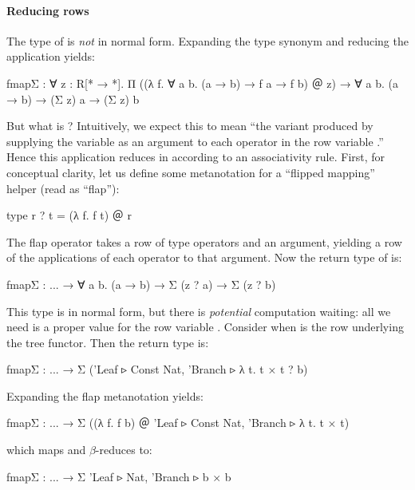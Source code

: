 \documentclass[sigplan,screen]{acmart}
\begin{document}
\paragraph{Reducing rows}
\label{sec:reducing-rows2}

The type of  is \emph{not} in normal form. Expanding the  type synonym and reducing the application   yields:


\begin{rosi}
fmapΣ : ∀ z : R[* → *].
        Π ((λ f. ∀ a b. 
            (a → b) → f a → f b) ＠ z) →
        ∀ a b. (a → b) → (Σ z) a → (Σ z) b 
\end{rosi}


But what is ? Intuitively, we expect this to mean ``the variant produced by supplying the variable  as an argument to each operator in the row variable .'' Hence this application reduces in \Rome{} according to an associativity rule. First, for conceptual clarity, let us define some metanotation for a ``flipped mapping'' helper  (read as ``flap''):

\begin{rosi}
type r ? t = (λ f. f t) ＠ r
\end{rosi}

\Ni The flap operator takes a row of type operators and an argument, yielding a row of the applications of each operator to that argument. Now the return type of  is:

\begin{rosi}
fmapΣ : ... → ∀ a b. (a → b) → Σ (z ? a) → Σ (z ? b) 
\end{rosi}

This type is in normal form, but there is \emph{potential} computation waiting: all we need is a proper value for the row variable . Consider when  is the row underlying the tree functor. Then the return type is:

\begin{rosi}
fmapΣ : ... → Σ ({'Leaf ▹ Const Nat, 
                   'Branch ▹ λ t. t × t} ? b)
\end{rosi}

\Ni Expanding the flap metanotation yields:
\begin{rosi}
fmapΣ : ... → Σ ((λ f. f b) ＠  
               {'Leaf ▹ Const Nat, 'Branch ▹ λ t. t × t})
\end{rosi}
\Ni which maps and $\beta$-reduces to: 

\begin{rosi}
fmapΣ : ... → Σ {'Leaf ▹ Nat, 'Branch ▹ b × b}
\end{rosi}
\end{document}
